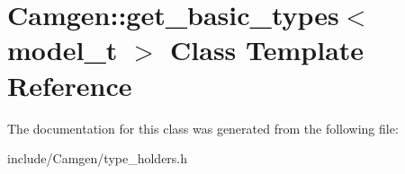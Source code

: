 \hypertarget{a00239}{\section{Camgen\-:\-:get\-\_\-basic\-\_\-types$<$ model\-\_\-t $>$ Class Template Reference}
\label{a00239}
}


The documentation for this class was generated from the following file\-:\begin{DoxyCompactItemize}
\item 
include/\-Camgen/type\-\_\-holders.\-h\end{DoxyCompactItemize}
